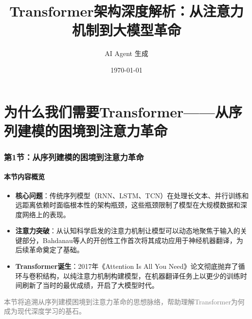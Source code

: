\documentclass[11pt]{beamer}
\title{Transformer架构深度解析：从注意力机制到大模型革命}
\author{AI Agent 生成}
\date{\today}
\begin{document}
\maketitle

\tableofcontents
\newpage

\section{为什么我们需要Transformer——从序列建模的困境到注意力革命}

\begin{frame}
\frametitle{第1节：从序列建模的困境到注意力革命}
\framesubtitle{本节内容概览}

\begin{itemize}
    \item \textbf{核心问题}：传统序列模型（RNN、LSTM、TCN）在处理长文本、并行训练和远距离依赖时面临根本性的架构瓶颈，这些瓶颈限制了模型在大规模数据和深度网络上的表现。
    \item \textbf{注意力突破}：从认知科学启发的注意力机制让模型可以动态地聚焦于输入的关键部分，Bahdanau等人的开创性工作首次将其成功应用于神经机器翻译，为后续革命奠定了基础。
    \item \textbf{Transformer诞生}：2017年《Attention Is All You Need》论文彻底抛弃了循环与卷积结构，以纯注意力机制构建模型，在机器翻译任务上以更少的训练时间刷新了当时的最优成绩，开启了大模型时代。
\end{itemize}

\vspace{0.5cm}
\textcolor{gray}{\small 本节将追溯从序列建模困境到注意力革命的思想脉络，帮助理解Transformer为何成为现代深度学习的基石。}
\end{frame}
\end{document}
